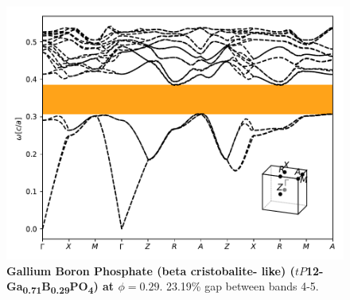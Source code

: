 \documentclass[fleqn,amsmath,amssymb,superscriptaddress, reprint,prl]{revtex4-1}
\begin{document}
\begin{figure}
\includegraphics[width=0.9\linewidth]{workspace/570467f77b8c01223b449c7a6035dbc2/images/r=21.pdf}
	\caption{\textbf{Gallium Boron Phosphate (beta cristobalite- like) ($tP$12-Ga\textsubscript{0}\textsubscript{.}\textsubscript{7}\textsubscript{1}B\textsubscript{0}\textsubscript{.}\textsubscript{2}\textsubscript{9}PO\textsubscript{4}) at $\phi=0.29$}. 23.19\% gap between bands 4-5.}
\end{figure}
\end{document}
